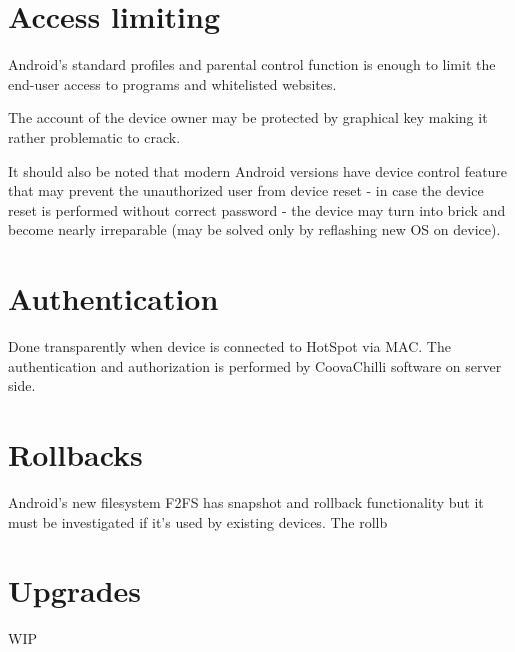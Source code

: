 \documentclass[a4paper, sans, booktabs, totpages, english]{report}
\begin{document}
\section{Access limiting}

Android's standard profiles and parental control function is enough to
limit the end-user access to programs and whitelisted websites.

The account of the device owner may be protected by graphical key
making it rather problematic to crack.

It should also be noted that modern Android versions have device control
feature that may prevent the unauthorized user from device reset -
in case the device reset is performed without correct password - the
device may turn into brick and become nearly irreparable (may be
solved only by reflashing new OS on device).


\section{Authentication}

Done transparently when device is connected to HotSpot via MAC. The
authentication and authorization is performed by CoovaChilli software
on server side.


\section{Rollbacks}

Android's new filesystem F2FS has snapshot and rollback functionality
but it must be investigated if it's used by existing devices. The
rollb


\section{Upgrades}

WIP
\end{document}
